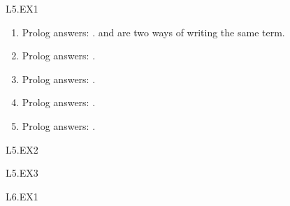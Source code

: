 \begin{mozartANSWER}{L5.EX1}
\begin{enumerate}
\item{} Prolog answers: .  and \mozartEMPTY
{} are two ways of writing the same term.
\item{} Prolog answers: .
\item{} Prolog answers: .
\item{} Prolog answers: .
\item{} Prolog answers: .
\end{enumerate}
\end{mozartANSWER}
\begin{mozartANSWER}{L5.EX2}\begin{mozartCODEDISPLAY}\end{mozartCODEDISPLAY}
 \mozartEMPTY
\begin{mozartCODEDISPLAY}\end{mozartCODEDISPLAY}
\end{mozartANSWER}
\begin{mozartANSWER}{L5.EX3}\begin{mozartCODEDISPLAY}\end{mozartCODEDISPLAY}
\end{mozartANSWER}
\begin{mozartANSWER}{L6.EX1}\begin{mozartCODEDISPLAY}\end{mozartCODEDISPLAY}
\end{mozartANSWER}

